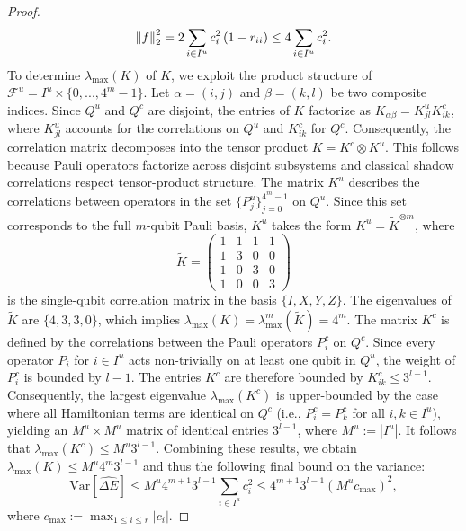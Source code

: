 \begin{proof}
\begin{equation}
    \norm{f}^2_2=2\sum_{i\in I^u}c_i^2\left(1-r_{ii}\right)\leq 4\sum_{i\in I^u}c_i^2.
\end{equation}
To determine $\lambda_{\mathrm{max}}(K)$ of $K$, we exploit the product structure of $\mathcal{F}^u=I^u\times \{0,...,4^m-1\}$. Let $\alpha=(i,j)$ and $\beta=(k,l)$ be two composite indices. Since $Q^u$ and $Q^c$ are disjoint, the entries of $K$ factorize as $K_{\alpha\beta}= K^u_{jl}K^c_{ik}$, where $K^u_{jl}$ accounts for the correlations on $Q^u$ and $K^c_{ik}$ for $Q^c$. Consequently, the correlation matrix decomposes into the tensor product $K=K^c\otimes K^u$. This follows because Pauli operators factorize across disjoint subsystems and classical shadow correlations respect tensor-product structure. The matrix $K^u$ describes the correlations between operators in the set $\{P^u_j\}_{j=0}^{4^m-1}$ on $Q^u$. Since this set corresponds to the full $m$-qubit Pauli basis, $K^u$ takes the form $K^u=\tilde{K}^{\otimes m}$, where 
\begin{equation}
\tilde{K}
=\begin{pmatrix}
    1&1&1&1\\1&3&0&0\\1&0&3&0\\1&0&0&3
\end{pmatrix}
\end{equation}
is the single-qubit correlation matrix in the basis $\{I,X,Y,Z\}$. The eigenvalues of $\tilde{K}$ are $\{4,3,3,0\}$, which implies $\lambda_\mathrm{max}(K)=\lambda^m_\mathrm{max}(\tilde{K})=4^m$. The matrix $K^c$ is defined by the correlations between the Pauli operators $P^c_i$ on $Q^c$. Since every operator $P_i$ for $i\in I^u$ acts non-trivially on at least one qubit in $Q^u$, the weight of $P_i^c$ is bounded by $l-1$. The entries $K^c$ are therefore bounded by $K^c_{ik}\leq 3^{l-1}$. Consequently, the largest eigenvalue $\lambda_\mathrm{max}(K^c)$ is upper-bounded by the case where all Hamiltonian terms are identical on $Q^c$ (i.e., $P^c_i=P^c_k$ for all $i,k\in I^u$), yielding an $M^u\times M^u$ matrix of identical entries $3^{l-1}$, where $M^u:=|I^u|$. It follows that $\lambda_\mathrm{max}(K^c)\leq M^u3^{l-1}$. Combining these results, we obtain $\lambda_\mathrm{max}(K)\leq M^u 4^m 3^{l-1}$ and thus the following final bound on the variance:
\begin{equation}
    \mathrm{Var}\left[\hat{\Delta E}\right]\leq  M^u4^{m+1}3^{l-1}\sum_{i\in I^u}c^2_i\leq 4^{m+1}3^{l-1}(M^uc_\mathrm{max})^2,
\end{equation}
where $c_\mathrm{max}:=\max_{1\leq i\leq r}|c_i|$.
\end{proof}
